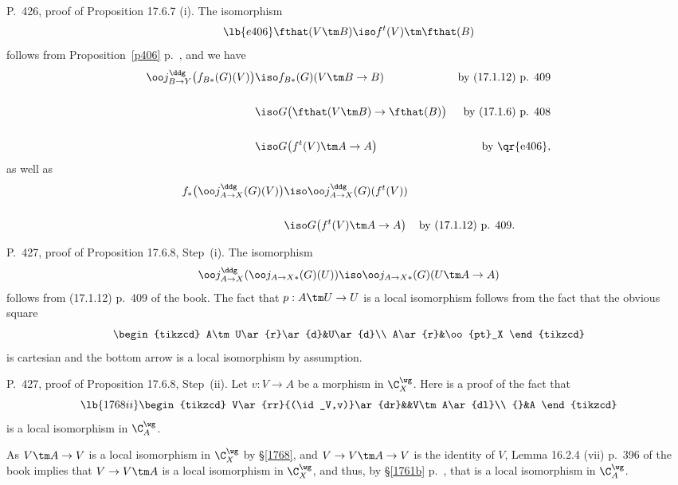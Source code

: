 \documentclass[12pt]{article}
\theoremstyle{remark}
\theoremstyle{definition}
\begin{document}
%

\begin{s} 
P.~426, proof of Proposition 17.6.7 (i). The isomorphism 
\begin{equation}\lb{e406}
\fthat(V\tm B)\iso f^t(V)\tm\fthat(B)
\end{equation} 
follows from Proposition~\ref{p406} p.~, and we have 
\begin{align*} 
%
\oo j_{B\to Y}^\ddg\big(f_{B*}(G)(V)\big)&\iso f_{B*}(G)(V\tm B\to B)&\text{by (17.1.12) p. 409}\\ \\ 
%
&\iso G\big(\fthat(V\tm B)\to\fthat(B)\big)&\text{by (17.1.6) p. 408}\\ \\ 
%
&\iso G\big(f^t(V)\tm A\to A\big)&\text{by \qr{e406}}, 
% 
\end{align*} 
as well as 
\begin{align*} 
%
f_*\big(\oo j_{A\to X}^\ddg(G)(V)\big)&\iso\oo j_{A\to X}^\ddg(G)(f^t(V))\\ \\ 
%
&\iso G\big(f^t(V)\tm A\to A\big)&\text{by (17.1.12) p. 409}. 
% 
\end{align*}  
\end{s} 

% 

\begin{s}
P.~427, proof of Proposition 17.6.8, Step~(i). The isomorphism 
$$
\oo j_{A\to X}^\ddg(\oo j_{A\to X*}(G)(U))\iso\oo j_{A\to X*}(G)(U\tm A\to A)
$$ 
follows from (17.1.12) p.~409 of the book. The fact that $p:A\tm U\to U$ is a local isomorphism follows from the fact that the obvious square 
$$
\begin{tikzcd} 
A\tm U\ar{r}\ar{d}&U\ar{d}\\ 
A\ar{r}&\oo{pt}_X
\end{tikzcd}
$$ 
is cartesian and the bottom arrow is a local isomorphism by assumption. 
\end{s} 

%

\begin{s}
P.~427, proof of Proposition 17.6.8, Step~(ii). Let $v:V\to A$ be a morphism in $\C_X^\wg$. Here is a proof of the fact that 
\begin{equation}\lb{1768ii}
\begin{tikzcd} 
V\ar{rr}{(\id_V,v)}\ar{dr}&&V\tm A\ar{dl}\\ 
{}&A
\end{tikzcd}
\end{equation} 
is a local isomorphism in $\C_A^\wg$. 

As $V\tm A\to V$ is a local isomorphism in $\C_X^\wg$ by \S\ref{1768}, and $V\to V\tm A\to V$ is the identity of $V$, Lemma 16.2.4 (vii) p.~396 of the book implies that $V\to V\tm A$ is a local isomorphism in $\C_X^\wg$, and thus, by \S\ref{1761b} p.~, that  is a local isomorphism in $\C_A^\wg$. 
\end{s} 
\end{document}
